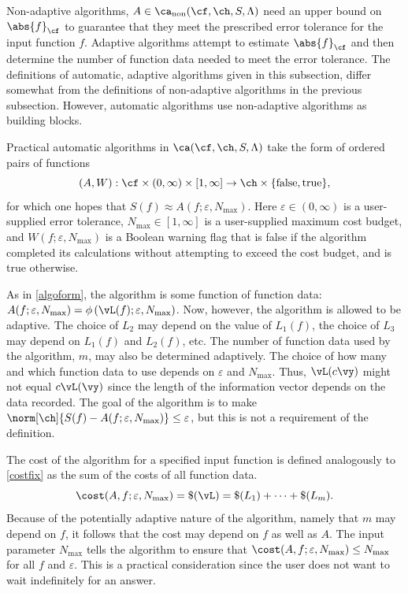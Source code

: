 \documentclass[]{elsarticle}
\DeclareMathOperator{\fix}{non}
\theoremstyle{definition}
\theoremstyle{remark}
\newcommand{\Fnorm}[1]{\abs{#1}_{\cf}}
\begin{document}
Non-adaptive algorithms, $A \in \ca_{\fix}(\cf,\ch,S,\Lambda)$ need an upper bound on $\Fnorm{f}$ to guarantee that they meet the prescribed error tolerance for the input function $f$.  Adaptive algorithms attempt to estimate $\Fnorm{f}$ and then determine the number of function data needed to meet the error tolerance.  The definitions of automatic, adaptive algorithms given in this subsection, differ somewhat from the definitions of non-adaptive algorithms in the previous subsection.  However, automatic algorithms use non-adaptive algorithms as building blocks.

Practical automatic algorithms in $\ca(\cf,\ch,S,\Lambda)$ take the form of ordered pairs of functions
\[
(A,W): \cf \times (0,\infty)\times [1,\infty] \to \ch \times \{\text{false},\text{true}\},
\]
for which one hopes that $S(f) \approx A(f;\varepsilon,N_{\max})$.  Here $\varepsilon \in (0,\infty)$ is a user-supplied error tolerance, $N_{\max} \in [1,\infty]$ is a user-supplied maximum cost budget, and $W(f;\varepsilon,N_{\max})$ is a Boolean warning flag that is false if the algorithm completed its calculations without attempting to exceed the cost budget, and is true otherwise.  

As in \eqref{algoform}, the algorithm is some function of function data: $A(f;\varepsilon,N_{\max}) = \phi\left(\vL(f);\varepsilon,N_{\max}\right)$.
Now, however, the algorithm is allowed to be adaptive. The choice of $L_2$ may depend on the value of $L_1(f)$, the choice of $L_3$ may depend on $L_1(f)$ and $L_2(f)$, etc.  The number of function data used by the algorithm, $m$, may also be determined adaptively. The choice of how many and which function data to use depends on $\varepsilon$ and $N_{\max}$.  Thus, $\vL(c\vy)$ might not equal $c\vL(\vy)$ since the length of the information vector depends on the data recorded.  The goal of the algorithm is to make $\norm[\ch]{S(f) - A(f;\varepsilon,N_{\max})} \le \varepsilon$, but this is not a requirement of the definition.

The cost of the algorithm for a specified input function is defined analogously to \eqref{costfix} as the sum of the costs of all function data.
\[
\cost(A,f;\varepsilon,N_{\max}) = \$(\vL) = \$(L_1) + \cdots +\$(L_m).
\]
Because of the potentially adaptive nature of the algorithm, namely that $m$ may depend on $f$, it follows that the cost may depend on $f$ as well as $A$. The input parameter $N_{\max}$ tells the algorithm to ensure that $\cost(A,f;\varepsilon,N_{\max}) \le N_{\max}$ for all $f$ and $\varepsilon$.  This is a practical consideration since the user does not want to wait indefinitely for an answer.  
\end{document}
